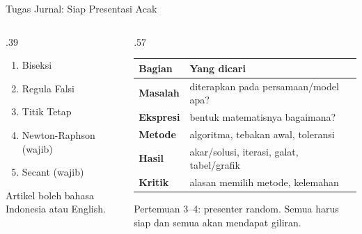 \documentclass[aspectratio=169,10pt]{beamer}
\begin{document}
\begin{frame}{Tugas Jurnal: Siap Presentasi Acak}
\scriptsize
\begin{columns}[T,totalwidth=\textwidth]
\begin{column}{.39\textwidth}
\begin{bluebox}[Metode]
\begin{enumerate}\setlength\itemsep{2pt}
\item Biseksi
\item Regula Falsi
\item Titik Tetap
\item Newton-Raphson (wajib)
\item Secant (wajib)
\end{enumerate}
\end{bluebox}
\begin{greenbox}[Bahasa]
Artikel boleh bahasa Indonesia atau English.
\end{greenbox}
\end{column}
\begin{column}{.57\textwidth}
\begin{tabularx}{\linewidth}{>{\bfseries}p{.25\linewidth} X}
\toprule
Bagian & Yang dicari\\
\midrule
Masalah & diterapkan pada persamaan/model apa?\\
Ekspresi & bentuk matematisnya bagaimana?\\
Metode & algoritma, tebakan awal, toleransi\\
Hasil & akar/solusi, iterasi, galat, tabel/grafik\\
Kritik & alasan memilih metode, kelemahan\\
\bottomrule
\end{tabularx}
\begin{orangebox}[Presentasi]
Pertemuan 3--4: presenter random. Semua harus siap dan semua akan mendapat giliran.
\end{orangebox}
\end{column}
\end{columns}
\end{frame}
\end{document}
